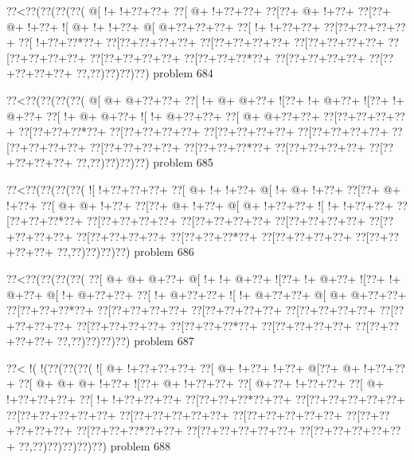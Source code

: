 \vbox{\vbox{\goo
\0??<\0??(\0??(\0??(\0??(
\- @[\- !+\- !+\0??+\0??+
\0??[\- @+\- !+\0??+\0??+
\0??[\0??+\- @+\- !+\0??+
\0??[\0??+\- @+\- !+\0??+
\- ![\- @+\- !+\- !+\0??+
\- @[\- @+\0??+\0??+\0??+
\0??[\- !+\- !+\0??+\0??+
\0??[\0??+\0??+\0??+\0??+
\0??[\- !+\0??+\0??*\0??+
\0??[\0??+\0??+\0??+\0??+
\0??[\0??+\0??+\0??+\0??+
\0??[\0??+\0??+\0??+\0??+
\0??[\0??+\0??+\0??+\0??+
\0??[\0??+\0??+\0??+\0??+
\0??[\0??+\0??+\0??*\0??+
\0??[\0??+\0??+\0??+\0??+
\0??[\0??+\0??+\0??+\0??+
\0??,\0??)\0??)\0??)\0??)
}
\hfil problem 684\hfil\break
}

\vbox{\vbox{\goo
\0??<\0??(\0??(\0??(\0??(
\- @[\- @+\- @+\0??+\0??+
\0??[\- !+\- @+\- @+\0??+
\- ![\0??+\- !+\- @+\0??+
\- ![\0??+\- !+\- @+\0??+
\0??[\- !+\- @+\- @+\0??+
\- ![\- !+\- @+\0??+\0??+
\0??[\- @+\- @+\0??+\0??+
\0??[\0??+\0??+\0??+\0??+
\0??[\0??+\0??+\0??*\0??+
\0??[\0??+\0??+\0??+\0??+
\0??[\0??+\0??+\0??+\0??+
\0??[\0??+\0??+\0??+\0??+
\0??[\0??+\0??+\0??+\0??+
\0??[\0??+\0??+\0??+\0??+
\0??[\0??+\0??+\0??*\0??+
\0??[\0??+\0??+\0??+\0??+
\0??[\0??+\0??+\0??+\0??+
\0??,\0??)\0??)\0??)\0??)
}
\hfil problem 685\hfil\break
}

\vbox{\vbox{\goo
\0??<\0??(\0??(\0??(\0??(
\- ![\- !+\0??+\0??+\0??+
\0??[\- @+\- !+\- !+\0??+
\- @[\- !+\- @+\- !+\0??+
\0??[\0??+\- @+\- !+\0??+
\0??[\- @+\- @+\- !+\0??+
\0??[\0??+\- @+\- !+\0??+
\- @[\- @+\- !+\0??+\0??+
\- ![\- !+\- !+\0??+\0??+
\0??[\0??+\0??+\0??*\0??+
\0??[\0??+\0??+\0??+\0??+
\0??[\0??+\0??+\0??+\0??+
\0??[\0??+\0??+\0??+\0??+
\0??[\0??+\0??+\0??+\0??+
\0??[\0??+\0??+\0??+\0??+
\0??[\0??+\0??+\0??*\0??+
\0??[\0??+\0??+\0??+\0??+
\0??[\0??+\0??+\0??+\0??+
\0??,\0??)\0??)\0??)\0??)
}
\hfil problem 686\hfil\break
}

\vbox{\vbox{\goo
\0??<\0??(\0??(\0??(\0??(
\0??[\- @+\- @+\- @+\0??+
\- @[\- !+\- !+\- @+\0??+
\- ![\0??+\- !+\- @+\0??+
\- ![\0??+\- !+\- @+\0??+
\- @[\- !+\- @+\0??+\0??+
\0??[\- !+\- @+\0??+\0??+
\- ![\- !+\- @+\0??+\0??+
\- @[\- @+\- @+\0??+\0??+
\0??[\0??+\0??+\0??*\0??+
\0??[\0??+\0??+\0??+\0??+
\0??[\0??+\0??+\0??+\0??+
\0??[\0??+\0??+\0??+\0??+
\0??[\0??+\0??+\0??+\0??+
\0??[\0??+\0??+\0??+\0??+
\0??[\0??+\0??+\0??*\0??+
\0??[\0??+\0??+\0??+\0??+
\0??[\0??+\0??+\0??+\0??+
\0??,\0??)\0??)\0??)\0??)
}
\hfil problem 687\hfil\break
}

\vbox{\vbox{\goo
\0??<\- !(\- !(\0??(\0??(\0??(
\- ![\- @+\- !+\0??+\0??+\0??+
\0??[\- @+\- !+\0??+\- !+\0??+
\- @[\0??+\- @+\- !+\0??+\0??+
\0??[\- @+\- @+\- @+\- !+\0??+
\- ![\0??+\- @+\- !+\0??+\0??+
\0??[\- @+\0??+\- !+\0??+\0??+
\0??[\- @+\- !+\0??+\0??+\0??+
\0??[\- !+\- !+\0??+\0??+\0??+
\0??[\0??+\0??+\0??*\0??+\0??+
\0??[\0??+\0??+\0??+\0??+\0??+
\0??[\0??+\0??+\0??+\0??+\0??+
\0??[\0??+\0??+\0??+\0??+\0??+
\0??[\0??+\0??+\0??+\0??+\0??+
\0??[\0??+\0??+\0??+\0??+\0??+
\0??[\0??+\0??+\0??*\0??+\0??+
\0??[\0??+\0??+\0??+\0??+\0??+
\0??[\0??+\0??+\0??+\0??+\0??+
\0??,\0??)\0??)\0??)\0??)\0??)
}
\hfil problem 688\hfil\break
}

